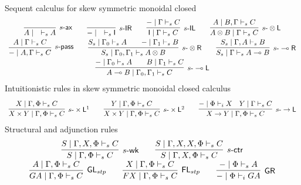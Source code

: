 \documentclass{article}
\newcommand{\tl}{\otimes \mathsf{L}}
\newcommand{\tr}{\otimes \mathsf{R}}
\newcommand{\lright}{\multimap \mathsf{R}}
\newcommand{\lleft}{\multimap \mathsf{L}}
\newcommand{\pass}{\mathsf{pass}}
\newcommand{\unitl}{\mathsf{IL}}
\newcommand{\unitr}{\mathsf{IR}}
\newcommand{\ax}{\mathsf{ax}}
\newcommand{\ot}{\otimes}
\newcommand{\lolli}{\multimap}
\newcommand{\I}{\mathsf{I}}
\newcommand{\fl}{\mathsf{FL}}
\newcommand{\gl}{\mathsf{GL}}
\newcommand{\gr}{\mathsf{GR}}
\newcommand{\td}{\text{-}}
\newcommand{\tms}{\times}
\newcommand{\tmslf}{\times \mathsf{L}^{1}}
\newcommand{\tmsls}{\times \mathsf{L}^{2}}
\newcommand{\rarl}{\rightarrow \mathsf{L}}
\newcommand{\wk}{\mathsf{wk}}
\newcommand{\ctr}{\mathsf{ctr}}
\newcommand{\ex}{\mathsf{ex}}
\begin{document}
 Sequent calculus for skew symmetric monoidal closed
 \vspace{-0.15cm}
  \begin{displaymath}
  \begin{array}{cc}
    \infer[s\td\ax]{A \mid \quad \vdash_{s} A}{}
    \qquad
    \infer[s\td\unitr]{- \mid \quad \vdash_{s} \I}{}
    \qquad
    \infer[s\td\unitl]{\I \mid \Gamma \vdash_{s} C}{- \mid \Gamma \vdash_{s} C}
    \qquad
    \infer[s\td\tl]{A \ot B \mid \Gamma \vdash_{s} C}{A \mid B , \Gamma \vdash_{s} C}
    \\
    \infer[s\td\pass]{- \mid A, \Gamma \vdash_{s} C}{A \mid \Gamma \vdash_{s} C}
    \qquad
    \infer[s\td\tr]{S_{s} \mid \Gamma_{0} , \Gamma_{1} \vdash_{s} A \ot B}{
     \deduce{S_{s} \mid \Gamma_{0} \vdash_{s} A}{}
     \qquad
     \deduce{- \mid \Gamma_{1} \vdash_{s} B}{}
    }
    \qquad
    \infer[s\td\lright]{S_{s} \mid \Gamma \vdash_{s} A \lolli B}{S_{s} \mid \Gamma , A \vdash_{s} B}
    \\
    \infer[s\td\lleft]{A \lolli B \mid \Gamma_{0} , \Gamma_{1} \vdash_{s} C}{
     \deduce{- \mid \Gamma_{0} \vdash_{s} A}{}
     \qquad
     \deduce{B \mid \Gamma_{1} \vdash_{s} C}{}
    }
  \end{array}
  \end{displaymath}
  Intuitionistic rules in skew symmetric monoidal closed calculus
  \begin{displaymath}
    \begin{array}{cc}
      \infer[s\td\tmslf]{X \tms Y \mid \Gamma , \Phi \vdash_{s} C}{X \mid \Gamma , \Phi \vdash_{s} C}
      \qquad
      \infer[s\td\tmsls]{X \tms Y \mid \Gamma , \Phi \vdash_{s} C}{Y \mid \Gamma , \Phi \vdash_{s} C}
      \qquad
      \infer[s\td\rarl]{X \rightarrow Y \mid \Gamma , \Phi \vdash_{s} C}{
        \deduce{- \mid \Phi \vdash_{i} X}{}
        &
        \deduce{Y \mid \Gamma \vdash_{s} C}{}
      }
    \end{array}
  \end{displaymath}
  Structural and adjunction rules
  \begin{displaymath}
    \begin{array}{cc}
      \infer[s\td\wk]{S \mid  \Gamma , \Phi \vdash_{s} C}{S \mid \Gamma , X, \Phi \vdash_{s} C}
      \qquad
      \infer[s\td\ctr]{S \mid \Gamma , X, \Phi \vdash_{s} C}{S \mid \Gamma , X  ,X , \Phi \vdash_{s} C}
      \\
      \infer[\gl_{stp}]{GA \mid \Gamma , \Phi \vdash_{s} C}{A \mid \Gamma , \Phi \vdash_{s} C}
      \qquad
      \infer[\fl_{stp}]{FX \mid \Gamma , \Phi \vdash_{s} C}{X \mid \Gamma , \Phi \vdash_{s} C}
      \qquad
      \infer[\gr]{- \mid \Phi \vdash_{i} GA}{- \mid \Phi \vdash_{s} A}
    \end{array}
  \end{displaymath}
\end{document}
